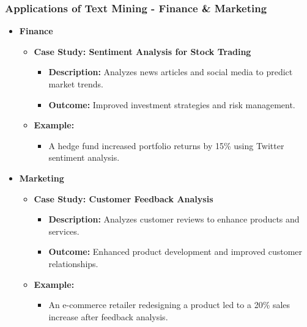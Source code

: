 \documentclass[aspectratio=169]{beamer}
\begin{document}
\begin{frame}[fragile]
    \frametitle{Applications of Text Mining - Finance \& Marketing}
    
    \begin{itemize}
        \item \textbf{Finance}
        \begin{itemize}
            \item \textbf{Case Study: Sentiment Analysis for Stock Trading}
            \begin{itemize}
                \item \textbf{Description:} Analyzes news articles and social media to predict market trends.
                \item \textbf{Outcome:} Improved investment strategies and risk management.
            \end{itemize}
            \item \textbf{Example:}
            \begin{itemize}
                \item A hedge fund increased portfolio returns by 15\% using Twitter sentiment analysis.
            \end{itemize}
        \end{itemize}
        
        \item \textbf{Marketing}
        \begin{itemize}
            \item \textbf{Case Study: Customer Feedback Analysis}
            \begin{itemize}
                \item \textbf{Description:} Analyzes customer reviews to enhance products and services.
                \item \textbf{Outcome:} Enhanced product development and improved customer relationships.
            \end{itemize}
            \item \textbf{Example:}
            \begin{itemize}
                \item An e-commerce retailer redesigning a product led to a 20\% sales increase after feedback analysis.
            \end{itemize}
        \end{itemize}
    \end{itemize}
\end{frame}
\end{document}
